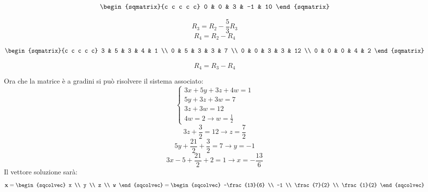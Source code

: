 \begin{esempio}
\begin{center}
\begin{minipage}{.4\textwidth}
\[\begin{sqmatrix}{c c c c c}
                    0 & 0 & 3 & -1 & 10
                \end{sqmatrix}
            \]
        \end{minipage}
        \begin{minipage}{.4\textwidth}
            \[
                R_3 = R_2 - \frac{5}{3}R_3
            \]
            \[
                R_4 = R_2 - R_4
            \]
        \end{minipage}
    \end{center}
    \begin{center}
        \begin{minipage}{.4\textwidth}
            \[
                \begin{sqmatrix}{c c c c c}
                    3 & 5 & 3 & 4 & 1 \\
                    0 & 5 & 3 & 3 & 7 \\
                    0 & 0 & 3 & 3 & 12 \\
                    0 & 0 & 0 & 4 & 2
                \end{sqmatrix}
            \]
        \end{minipage}
        \begin{minipage}{.4\textwidth}
            \[
                R_4 = R_3 - R_4
            \]
        \end{minipage}
    \end{center}
    Ora che la matrice è a gradini si può risolvere il sistema associato:
    \[
        \begin{cases}
            3x + 5y + 3z + 4w = 1 \\
            5y + 3z + 3w = 7 \\
            3z + 3w = 12 \\
            4w = 2 \rightarrow w = \frac{1}{2}
        \end{cases}
    \]
    \[
        3z + \frac{3}{2} = 12 \rightarrow z = \frac{7}{2}
    \]
    \[
        5y + \frac{21}{2} + \frac{3}{2} = 7 \rightarrow y = -1
    \]
    \[
        3x - 5 + \frac{21}{2} + 2 = 1 \rightarrow x = -\frac{13}{6}
    \]
    Il vettore soluzione sarà:
    \[
        \textbf{x} =
        \begin{sqcolvec}
            x \\
            y \\
            z \\
            w
        \end{sqcolvec}
        =
        \begin{sqcolvec}
            -\frac{13}{6} \\
            -1 \\
            \frac{7}{2} \\
            \frac{1}{2}
        \end{sqcolvec}
    \]
\end{esempio}
